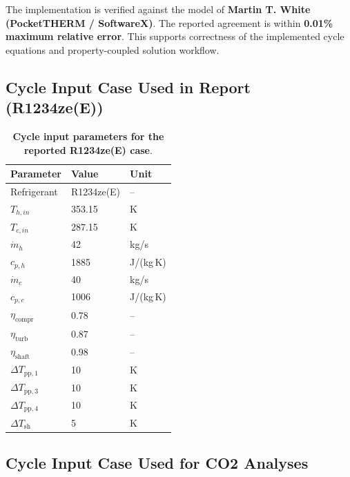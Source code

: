 The implementation is verified against the model of \textbf{Martin T. White (PocketTHERM / SoftwareX)}. The reported agreement is within \textbf{0.01\% maximum relative error}. This supports correctness of the implemented cycle equations and property-coupled solution workflow.

\subsection{Cycle Input Case Used in Report (R1234ze(E))}

\begin{table}[h!]
\centering
\caption{\textbf{Cycle input parameters for the reported R1234ze(E) case}.}
\begin{tabular}{lll}
\hline
\textbf{Parameter} & \textbf{Value} & \textbf{Unit} \\
\hline
Refrigerant & R1234ze(E) & -- \\
$T_{h,in}$ & 353.15 & K \\
$T_{c,in}$ & 287.15 & K \\
$\dot m_h$ & 42 & kg/s \\
$c_{p,h}$ & 1885 & J/(kg\,K) \\
$\dot m_c$ & 40 & kg/s \\
$c_{p,c}$ & 1006 & J/(kg\,K) \\
$\eta_{\mathrm{compr}}$ & 0.78 & -- \\
$\eta_{\mathrm{turb}}$ & 0.87 & -- \\
$\eta_{\mathrm{shaft}}$ & 0.98 & -- \\
$\Delta T_{\mathrm{pp},1}$ & 10 & K \\
$\Delta T_{\mathrm{pp},3}$ & 10 & K \\
$\Delta T_{\mathrm{pp},4}$ & 10 & K \\
$\Delta T_{\mathrm{sh}}$ & 5 & K \\
\hline
\end{tabular}
\end{table}

\subsection{Cycle Input Case Used for CO2 Analyses}

